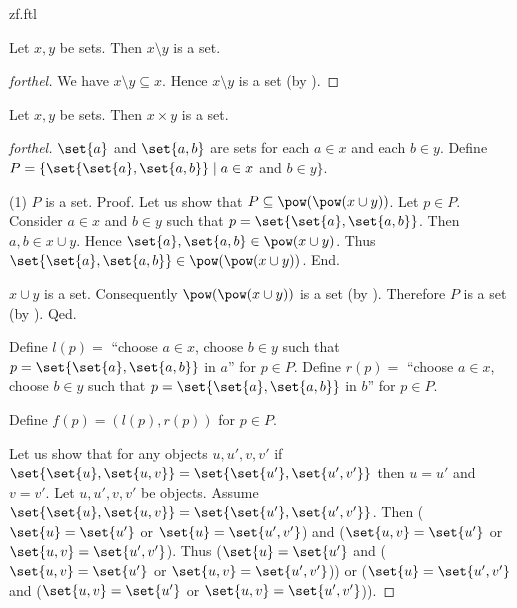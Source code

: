 \documentclass{naproche-library}
\begin{document}
\begin{smodule}{zf.ftl}
  \begin{proposition}[forthel,id=FOUNDATIONS_10_7795203882614784]
    Let $x, y$ be sets.
    Then $x \setminus y$ is a set.
  \end{proposition}
  \begin{proof}[forthel]
    We have $x \setminus y \subseteq x$.
    Hence $x \setminus y$ is a set (by ).
  \end{proof}

  \begin{proposition}[forthel,id=FOUNDATIONS_10_4458706448154624]
    Let $x, y$ be sets.
    Then $x \times y$ is a set.
  \end{proposition}
  \begin{proof}[forthel]
    $\set{a}$ and $\set{a,b}$ are sets for each $a \in x$ and each $b \in y$.
    Define $P = \{ \set{\set{a}, \set{a,b}} \mid a \in x$ and $b \in y \}$.

    (1) $P$ is a set. \newline
    Proof.
      Let us show that $P \subseteq \pow(\pow(x \cup y))$.
        Let $p \in P$.
        Consider $a \in x$ and $b \in y$ such that $p = \set{\set{a},\set{a,b}}$.
        Then $a, b \in x \cup y$.
        Hence $\set{a}, \set{a,b} \in \pow(x \cup y)$.
        Thus $\set{\set{a}, \set{a,b}} \in \pow(\pow(x \cup y))$.
      End.

      $x \cup y$ is a set.
      Consequently $\pow(\pow(x \cup y))$ is a set (by ).
      Therefore $P$ is a set (by ).
    Qed.

    Define $l(p) =$ ``choose $a \in x$, choose $b \in y$ such that $p = \set{\set{a}, \set{a,b}}$ in $a$'' for $p \in P$.
    Define $r(p) =$ ``choose $a \in x$, choose $b \in y$ such that $p = \set{\set{a}, \set{a,b}}$ in $b$'' for $p \in P$.

    Define $f(p) = (l(p), r(p))$ for $p \in P$.

    Let us show that for any objects $u, u', v, v'$ if
    $\set{\set{u}, \set{u,v}} = \set{\set{u'}, \set{u',v'}}$ then $u = u'$ and $v = v'$.
      Let $u, u', v, v'$ be objects.
      Assume $\set{\set{u}, \set{u,v}} = \set{\set{u'}, \set{u',v'}}$.
      Then ($\set{u} = \set{u'}$ or $\set{u} = \set{u',v'}$) and ($\set{u,v} = \set{u'}$ or $\set{u,v} = \set{u',v'}$).
      Thus ($\set{u} = \set{u'}$ and ($\set{u,v} = \set{u'}$ or $\set{u,v} = \set{u',v'}$)) or ($\set{u} = \set{u',v'}$ and ($\set{u,v} = \set{u'}$ or $\set{u,v} = \set{u',v'}$)).


\end{proof}
\end{smodule}
\end{document}
